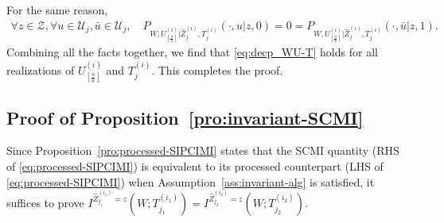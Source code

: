 \documentclass[onecolumn,romanappendices,10pt]{IEEEtran}
\newcommand{\Ucal}{{\mathcal U}}
\newcommand{\Zcal}{{\mathcal Z}}
\begin{document}
	For the same reason,
	\begin{equation}
		\begin{aligned}
			\forall z \in \Zcal, \forall u \in \Ucal_j, \bar{u} \in \Ucal_j, \quad P_{W, U^{(i)}_{[\frac{n}{k}]} | \hat{Z}^{(i)}_j, T^{(i)}_j} (\cdot, u | z, 0) = 0 = P_{W, U^{(i)}_{[\frac{n}{k}]} | \hat{Z}^{(i)}_j, T^{(i)}_j} (\cdot, \bar{u} | z, 1).
		\end{aligned}
	\end{equation}
	Combining all the facts together, we find that \eqref{eq:decp_WU-T} holds for all realizations of $U^{(i)}_{[\frac{n}{k}]}$ and $T^{(i)}_j$. This completes the proof.
	
	\subsection{Proof of Proposition~\ref{pro:invariant-SCMI}} \label{subapp:invariant-SCMI}
	Since Proposition~\ref{pro:processed-SIPCIMI} states that the SCMI quantity (RHS of \eqref{eq:processed-SIPCIMI}) is equivalent to its processed counterpart (LHS of \eqref{eq:processed-SIPCIMI}) when Assumption~\ref{ass:invariant-alg} is satisfied, it suffices to prove $I^{\hat{Z}^{(i_1)}_{j_1} = z}\left( W; T^{(i_1)}_{j_1} \right) = I^{\hat{Z}^{(i_2)}_{j_2} = z}\left( W; T^{(i_2)}_{j_2} \right)$. 
	
\end{document}
